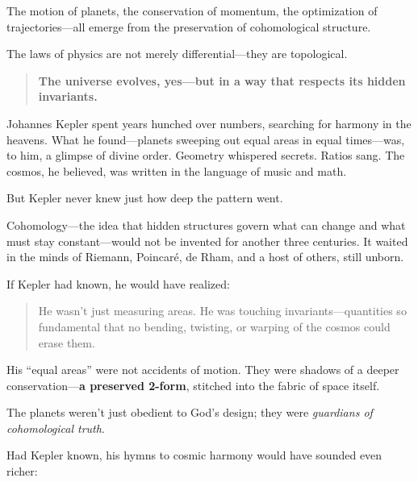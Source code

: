 \begin{tcolorbox}[colback=gray!5!white, colframe=gray!50!black, title={Summary}]
The motion of planets, the conservation of momentum, the optimization of trajectories—all emerge from the preservation of cohomological structure.

The laws of physics are not merely differential—they are topological.

\begin{quote}
\textbf{The universe evolves, yes—but in a way that respects its hidden invariants.}
\end{quote}
\end{tcolorbox}



\begin{tcolorbox}[colback=blue!5!white, colframe=blue!50!black, breakable, title={Historical Sidebar: If Kepler Had Known Cohomology}]

    Johannes Kepler spent years hunched over numbers, searching for harmony in the heavens.
    What he found—planets sweeping out equal areas in equal times—was, to him, a glimpse of divine order.
    Geometry whispered secrets. Ratios sang. The cosmos, he believed, was written in the language of music and math.
    
    But Kepler never knew just how deep the pattern went.
    
    Cohomology—the idea that hidden structures govern what can change and what must stay constant—would not be invented for another three centuries. It waited in the minds of Riemann, Poincaré, de Rham, and a host of others, still unborn.
    
    If Kepler had known, he would have realized:
    
    \begin{quote} He wasn’t just measuring areas.
    He was touching invariants—quantities so fundamental that no bending, twisting, or warping of the cosmos could erase them. \end{quote}
    
    His “equal areas” were not accidents of motion.
    They were shadows of a deeper conservation—\textbf{a preserved 2-form}, stitched into the fabric of space itself.
    
    The planets weren’t just obedient to God’s design;
    they were \emph{guardians of cohomological truth}.
    
    Had Kepler known, his hymns to cosmic harmony would have sounded even richer:
    

\end{tcolorbox}
